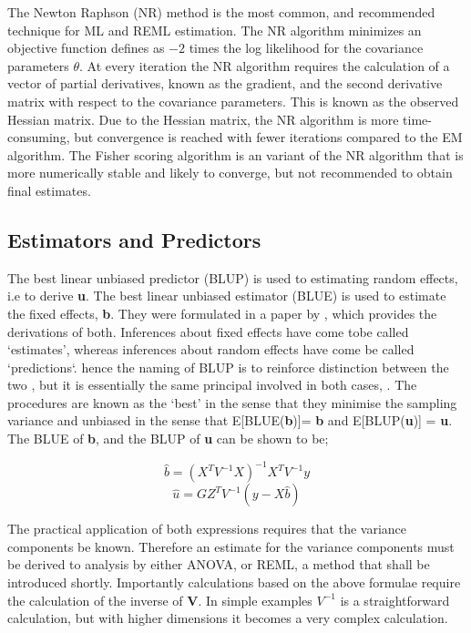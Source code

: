 \documentclass[12pt, a4paper]{report}
\theoremstyle{plain}
\theoremstyle{definition}
\theoremstyle{remark}
\begin{document}
The Newton Raphson (NR) method is the most common, and recommended technique for ML and
REML estimation. The NR algorithm minimizes an objective function defines as $-2$ times the log likelihood for the covariance parameters $\theta$. At every iteration the NR algorithm requires the
calculation of a vector of partial derivatives, known as the gradient, and the second derivative matrix with respect to the covariance parameters. This is known as the observed Hessian matrix. Due to the Hessian matrix, the NR algorithm is more time-consuming, but convergence is reached with fewer iterations compared to the EM algorithm. The Fisher scoring algorithm is an variant of the NR algorithm that is more numerically stable and likely to converge, but not recommended to obtain final estimates.




\subsection{Estimators and Predictors}

The best linear unbiased predictor (BLUP) is used to estimating
random effects, i.e to derive \textbf{u}. The best linear unbiased
estimator (BLUE) is used to estimate the fixed effects,
\textbf{b}. They were formulated in a paper by \cite{Henderson59},
which provides the derivations of both. Inferences about fixed
effects have come tobe called `estimates', whereas inferences
about random effects have come be called `predictions`. hence the
naming of BLUP is to reinforce distinction between the two , but
it is essentially the same principal involved in both cases,
\citep{Robinson}. The procedures are known as the `best' in the
sense that they minimise the sampling variance and unbiased in the
sense that E[BLUE(\textbf{b})]= \textbf{b} and E[BLUP(\textbf{u})]
= \textbf{u}. The BLUE of \textbf{b}, and the BLUP of \textbf{u}
can be shown to be;

\begin{equation}
\hat{b} = (X^{T}V^{-1}X)^{-1}X^{T}V^{-1}y
\end{equation}
\begin{equation}
\hat{u} = GZ^{T}V^{-1}(y-X\hat{b})
\end{equation}

The practical application of both expressions requires that the
variance components be known. Therefore an estimate for the
variance components must be derived to analysis by either ANOVA,
or REML, a method that shall be introduced shortly. Importantly
calculations based on the above formulae require the calculation
of the inverse of \textbf{V}. In simple examples $V^{-1}$ is a
straightforward calculation, but with higher dimensions it becomes
a very complex calculation.
\end{document}

